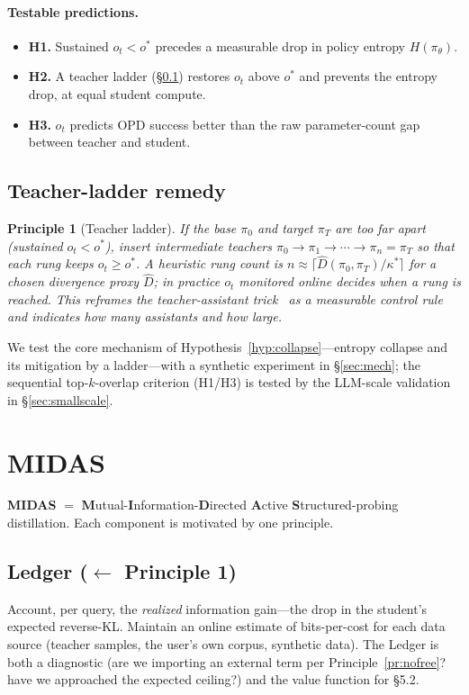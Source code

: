 \documentclass[11pt]{article}
\newtheorem{principle}{Principle}
\begin{document}
\paragraph{Testable predictions.}
\begin{itemize}
  \item \textbf{H1.} Sustained $o_t<o^\ast$ precedes a measurable drop in policy entropy $H(\pi_\theta)$.
  \item \textbf{H2.} A teacher ladder (\S\ref{sec:ladder}) restores $o_t$ above $o^\ast$ and prevents the entropy drop, at equal student compute.
  \item \textbf{H3.} $o_t$ predicts OPD success better than the raw parameter-count gap between teacher and student.
\end{itemize}

\subsection{Teacher-ladder remedy}
\label{sec:ladder}
\begin{principle}[Teacher ladder]\label{pr:ladder}
If the base $\pi_0$ and target $\pi_T$ are too far apart (sustained $o_t<o^\ast$), insert intermediate teachers $\pi_0\!\to\!\pi_1\!\to\!\cdots\!\to\!\pi_n=\pi_T$ so that each rung keeps $o_t\ge o^\ast$. A heuristic rung count is $n\approx\lceil \widehat{D}(\pi_0,\pi_T)/\kappa^\ast\rceil$ for a chosen divergence proxy $\widehat{D}$; in practice $o_t$ monitored online decides when a rung is reached. This reframes the teacher-assistant trick~\cite{bridge2025} as a measurable control rule and indicates \emph{how many} assistants and \emph{how large}.
\end{principle}

We test the core mechanism of Hypothesis~\ref{hyp:collapse}---entropy collapse and its mitigation by a ladder---with a synthetic experiment in \S\ref{sec:mech}; the sequential top-$k$-overlap criterion (H1/H3) is tested by the LLM-scale validation in \S\ref{sec:smallscale}.

\section{MIDAS}
\label{sec:midas}
\textbf{MIDAS} $=$ \textbf{M}utual-\textbf{I}nformation-\textbf{D}irected \textbf{A}ctive \textbf{S}tructured-probing distillation. Each component is motivated by one principle.

\subsection{Ledger (\texorpdfstring{$\leftarrow$}{<-} Principle 1)}
Account, per query, the \emph{realized} information gain---the drop in the student's expected reverse-KL. Maintain an online estimate of bits-per-cost for each data source (teacher samples, the user's own corpus, synthetic data). The Ledger is both a diagnostic (are we importing an external term per Principle~\ref{pr:nofree}? have we approached the expected ceiling?) and the value function for \S5.2.
\end{document}

